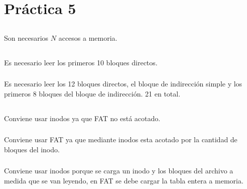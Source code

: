 \section{Práctica 5}

\subsection{}
Son necesarios $N$ accesos a memoria.

\subsection{}

\subsubsection{}
Es necesario leer los primeros 10 bloques directos.

\subsubsection{}
Es necesario leer los 12 bloques directos, el bloque de indirección simple y
los primeros 8 bloques del bloque de indirección. 21 en total.

\subsection{}

\subsubsection{}

\subsubsection{}
Conviene usar inodos ya que FAT no está acotado.

\subsubsection{}
Conviene usar FAT ya que mediante inodos esta acotado por la cantidad de
bloques del inodo.

\subsubsection{}
Conviene usar inodos porque se carga un inodo y los bloques del archivo a
medida que se van leyendo, en FAT se debe cargar la tabla entera a memoria.

